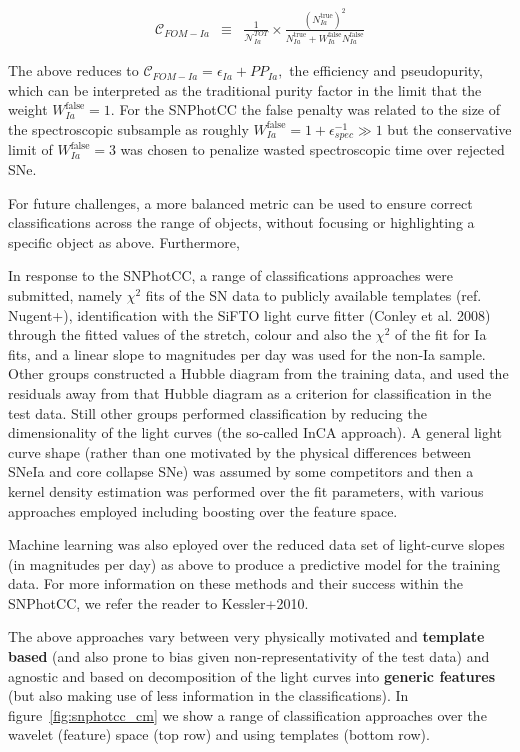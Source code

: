 \begin{eqnarray}
\mathcal{C}_{FOM-Ia} &\equiv& \frac{1}{\mathcal{N}_{Ia}^{TOT}}\times \frac{(N_{Ia}^{\mathrm{true}})^2}{N_{Ia}^\mathrm{true}+W_{Ia}^\mathrm{false}N_{Ia}^\mathrm{false}}
\end{eqnarray}

The above reduces to $\mathcal{C}_{FOM-Ia}  = \epsilon_{Ia} + PP_{Ia},$ the efficiency and pseudopurity, which can be interpreted as the traditional purity factor in the limit that the weight $W_{Ia}^\mathrm{false} = 1$.
For the SNPhotCC the false penalty was related to the size of the spectroscopic subsample as roughly $W_{Ia}^\mathrm{false} = 1 + \epsilon_{spec}^{-1} \gg 1$ but the conservative limit of $W_{Ia}^\mathrm{false} = 3$ was chosen to penalize wasted spectroscopic time over rejected SNe.

For future challenges, a more balanced metric can be used to ensure correct classifications across the range of objects, without focusing or highlighting a specific object as above.
Furthermore,

In response to the SNPhotCC, a range of classifications approaches were submitted, namely $\chi^{2}$ fits of the SN data to publicly available templates (ref. Nugent+), identification with the SiFTO light curve fitter (Conley et al. 2008) through the fitted values of the stretch, colour and also the $\chi^{2}$ of the fit for Ia fits, and a linear slope to magnitudes per day was used for the non-Ia sample.
Other groups constructed a Hubble diagram from the training data, and used the residuals away from that Hubble diagram as a criterion for classification in the test data.
Still other groups performed classification by reducing the dimensionality of the light curves (the so-called InCA approach).
A general light curve shape (rather than one motivated by the physical differences between SNeIa and core collapse SNe) was assumed by some competitors and then a kernel density estimation was performed over the fit parameters, with various approaches employed including boosting over the feature space.

Machine learning was also eployed over the reduced data set of light-curve slopes (in magnitudes per day) as above to produce a predictive model for the training data.
For more information on these methods and their success within the SNPhotCC, we refer the reader to Kessler+2010.

The above approaches vary between very physically motivated and \textbf{template based} (and also prone to bias given non-representativity of the test data) and agnostic and based on decomposition of the light curves into \textbf{generic features} (but also making use of less information in the classifications).
In figure~\ref{fig:snphotcc_cm} we show a range of classification approaches over the wavelet (feature) space (top row) and using templates (bottom row).

